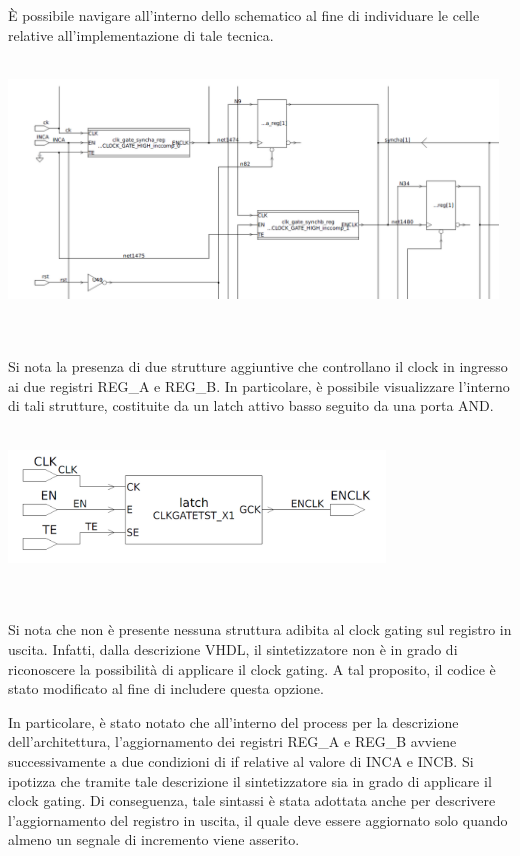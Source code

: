 \documentclass[11pt,  english, makeidx, a4paper, titlepage, oneside]{book}
\newenvironment{listato}{\footnotesize} {\normalsize }
\begin{document}
\vspace{0.3cm}          
È possibile navigare all'interno dello schematico al fine di individuare le celle relative all'implementazione di tale tecnica.        
\\\\
\centerline{\includegraphics[width=13cm]{./img/Lab_3/clock_gating_cells.png}}
\\\\
Si nota la presenza di due strutture aggiuntive che controllano il clock in ingresso ai due registri REG\_A e REG\_B. In particolare, è possibile visualizzare l'interno di tali strutture, costituite da un latch attivo basso seguito da una porta AND.
\\\\
\centerline{\includegraphics[width=10cm]{./img/Lab_3/clock_gating_implementation.png}}
\\\\       
Si nota che non è presente nessuna struttura adibita al clock gating sul registro in uscita. Infatti, dalla descrizione VHDL, il sintetizzatore non è in grado di riconoscere la possibilità di applicare il clock gating. A tal proposito, il codice è stato modificato al fine di includere questa opzione.
\begin{center}
\begin{listato}
	\centerline{}
\end{listato}
\end{center}
In particolare, è stato notato che all'interno del process per la descrizione dell'architettura, l'aggiornamento dei registri REG\_A e REG\_B avviene successivamente a due condizioni di if relative al valore di INCA e INCB. Si ipotizza che tramite tale descrizione il sintetizzatore sia in grado di applicare il clock gating. Di conseguenza, tale sintassi è stata adottata anche per descrivere l'aggiornamento del registro in uscita, il quale deve essere aggiornato solo quando almeno un segnale di incremento viene asserito.
\end{document}
